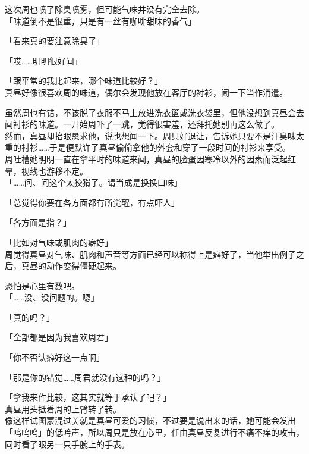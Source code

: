 这次周也喷了除臭喷雾，但可能气味并没有完全去除。\\

「味道倒不是很重，只是有一丝有咖啡甜味的香气」

「看来真的要注意除臭了」

「哎……明明很好闻」

「跟平常的我比起来，哪个味道比较好？」\\

真昼好像很喜欢周的味道，偶尔会发现他放在客厅的衬衫，闻一下当作消遣。

虽然周也有错，不该脱了衣服不马上放进洗衣篮或洗衣袋里，但他没想到真昼会去闻衬衫的味道。一开始周吓了一跳，觉得很害羞，还拜托她别再这么做了。\\

然而，真昼却抬眼恳求他，说也想闻一下。周只好退让，告诉她只要不是汗臭味太重的衬衫……于是便默许了真昼偷偷拿他的外套和穿了一段时间的衬衫来享受。\\

周吐槽她明明一直在拿平时的味道来闻，真昼的脸蛋因寒冷以外的因素而泛起红晕，视线也游移不定。\\

「……问、问这个太狡猾了。请当成是换换口味」

「总觉得你要在各方面都有所觉醒，有点吓人」

「各方面是指？」

「比如对气味或肌肉的癖好」\\

周觉得真昼对气味、肌肉和声音等方面已经可以称得上是癖好了，当他举出例子之后，真昼的动作变得僵硬起来。

恐怕是心里有数吧。\\

「……没、没问题的。嗯」

「真的吗？」

「全部都是因为我喜欢周君」

「你不否认癖好这一点啊」

「那是你的错觉……周君就没有这种的吗？」

「拿我来作比较，这其实就等于承认了吧？」\\

真昼用头抵着周的上臂转了转。\\

像这样试图蒙混过关就是真昼可爱的习惯，不过要是说出来的话，她可能会发出「呜呜呜」的低吟声，所以周只是放在心里，任由真昼反复进行不痛不痒的攻击，同时看了眼另一只手腕上的手表。\\

